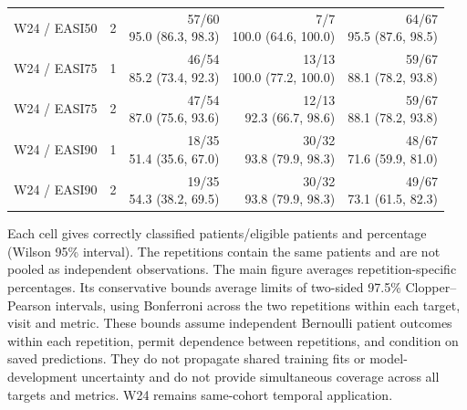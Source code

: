 {\begin{longtable}{llrrr}
W24 / EASI50 & 2 & \shortstack{57/60\\95.0 (86.3, 98.3)} & \shortstack{7/7\\100.0 (64.6, 100.0)} & \shortstack{64/67\\95.5 (87.6, 98.5)} \\[4pt]
W24 / EASI75 & 1 & \shortstack{46/54\\85.2 (73.4, 92.3)} & \shortstack{13/13\\100.0 (77.2, 100.0)} & \shortstack{59/67\\88.1 (78.2, 93.8)} \\[4pt]
W24 / EASI75 & 2 & \shortstack{47/54\\87.0 (75.6, 93.6)} & \shortstack{12/13\\92.3 (66.7, 98.6)} & \shortstack{59/67\\88.1 (78.2, 93.8)} \\[4pt]
W24 / EASI90 & 1 & \shortstack{18/35\\51.4 (35.6, 67.0)} & \shortstack{30/32\\93.8 (79.9, 98.3)} & \shortstack{48/67\\71.6 (59.9, 81.0)} \\[4pt]
W24 / EASI90 & 2 & \shortstack{19/35\\54.3 (38.2, 69.5)} & \shortstack{30/32\\93.8 (79.9, 98.3)} & \shortstack{49/67\\73.1 (61.5, 82.3)} \\[4pt]
\bottomrule\end{longtable}
}
Each cell gives correctly classified patients/eligible patients and percentage (Wilson 95\% interval). The repetitions contain the same patients and are not pooled as independent observations. The main figure averages repetition-specific percentages. Its conservative bounds average limits of two-sided 97.5\% Clopper--Pearson intervals, using Bonferroni across the two repetitions within each target, visit and metric. These bounds assume independent Bernoulli patient outcomes within each repetition, permit dependence between repetitions, and condition on saved predictions. They do not propagate shared training fits or model-development uncertainty and do not provide simultaneous coverage across all targets and metrics. W24 remains same-cohort temporal application.

